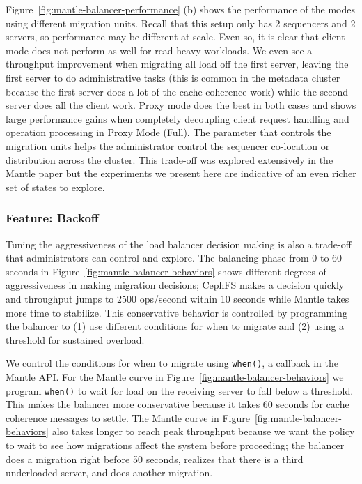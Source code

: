 \documentclass[preprint]{sigplanconf-eurosys}
\begin{document}

Figure~\ref{fig:mantle-balancer-performance} (b) shows the performance of the modes
using different migration units. Recall that this setup only has 2 sequencers
and 2 servers, so performance may be different at scale. Even so, it is clear
that client mode does not perform as well for read-heavy workloads. We even see
a throughput improvement when migrating all load off the first server, leaving
the first server to do administrative tasks (this is common in the metadata
cluster because the first server does a lot of the cache coherence work) while
the second server does all the client work. Proxy mode does the best in both
cases and shows large performance gains when completely decoupling client
request handling and operation processing in Proxy Mode (Full).  The parameter
that controls the migration units helps the administrator control the sequencer
co-location or distribution across the cluster. This trade-off was explored
extensively in the Mantle paper but the experiments we present here are
indicative of an even richer set of states to explore.

\subsubsection{Feature: Backoff}
\label{sec:feature-backoff}

Tuning the aggressiveness of the load balancer decision making is also a
trade-off that administrators can control and explore. The balancing phase from
0 to 60 seconds in Figure~\ref{fig:mantle-balancer-behaviors} shows different
degrees of aggressiveness in making migration decisions; CephFS makes a
decision quickly and throughput jumps to 2500 ops/second within 10 seconds
while Mantle takes more time to stabilize. This conservative behavior is
controlled by programming the balancer to (1) use different conditions for when
to migrate and (2) using a threshold for sustained overload. 

We control the conditions for when to migrate using \texttt{when()}, a callback
in the Mantle API.  For the Mantle curve in
Figure~\ref{fig:mantle-balancer-behaviors} we program \texttt{when()} to wait
for load on the receiving server to fall below a threshold. This makes the
balancer more conservative because it takes 60 seconds for cache coherence
messages to settle.  The Mantle curve in
Figure~\ref{fig:mantle-balancer-behaviors} also takes longer to reach peak
throughput because we want the policy to wait to see how migrations affect the
system before proceeding; the balancer does a migration right before 50
seconds, realizes that there is a third underloaded server, and does another
migration. 
\end{document}
